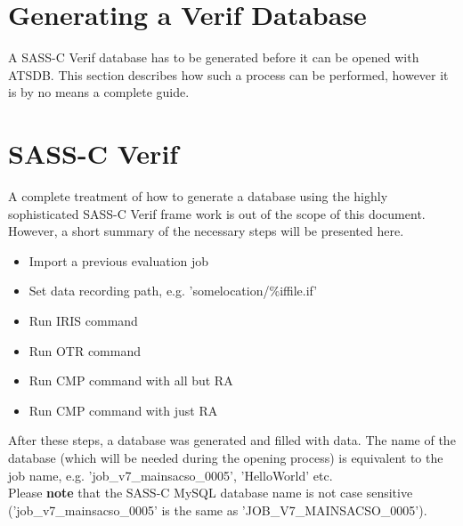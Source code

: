 \section*{Generating a Verif Database}
\label{sec:generation}

A SASS-C Verif database has to be generated before it can be opened with ATSDB.  This section describes how such
a process can be performed, however it is by no means a complete guide.

\section*{SASS-C Verif}
A complete treatment of how to generate a database using the highly sophisticated SASS-C Verif frame work  is  out  of  the  scope  of  this  document.   However,  a  short  summary  of  the  necessary  steps  will  be presented here.\\

\begin{itemize}  
\item Import a previous evaluation job
\item Set data recording path, e.g. 'somelocation/\%iffile.if'
\item Run IRIS command
\item Run OTR command
\item Run CMP command with all but RA
\item Run CMP command with just RA
\end{itemize}

After  these  steps,  a  database  was  generated  and  filled  with  data.   The  name  of  the  database  (which
will  be  needed  during  the  opening  process)  is  equivalent  to  the  job  name,  e.g.   'job\_v7\_mainsacso\_0005', 'HelloWorld' etc. \\

Please \textbf{note} that the SASS-C MySQL database name is not case sensitive ('job\_v7\_mainsacso\_0005' is the same as 'JOB\_V7\_MAINSACSO\_0005').
 
